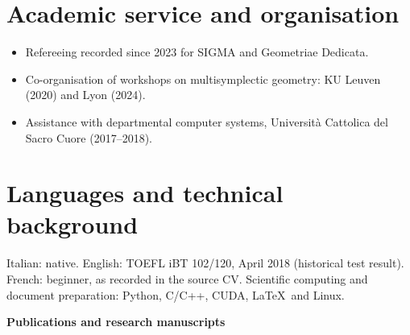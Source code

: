 \documentclass[11pt,a4paper]{article}
\begin{document}
\section*{Academic service and organisation}
\begin{itemize}
\item Refereeing recorded since 2023 for SIGMA and Geometriae Dedicata.
\item Co-organisation of workshops on multisymplectic geometry: KU Leuven (2020) and Lyon (2024).
\item Assistance with departmental computer systems, Universit\`a Cattolica del Sacro Cuore (2017--2018).
\end{itemize}
\section*{Languages and technical background}
Italian: native. English: TOEFL iBT 102/120, April 2018 (historical test result). French: beginner, as recorded in the source CV. Scientific computing and document preparation: Python, C/C++, CUDA, \LaTeX\ and Linux.
\clearpage
\begin{center}{\large\bfseries Publications and research manuscripts}\end{center}
\end{document}

